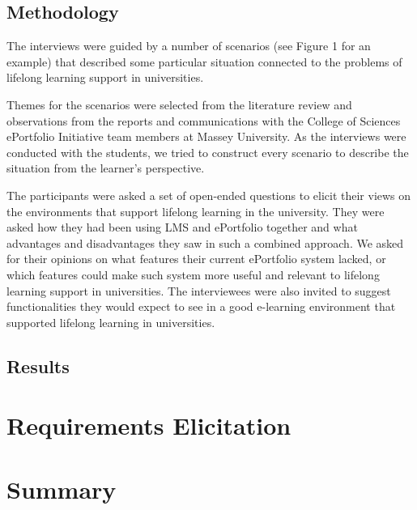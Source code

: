 \subsection{Methodology}

The interviews were guided by a number of scenarios (see Figure 1 for an
example) that described some particular situation connected to the problems of
lifelong learning support in universities.

Themes for the scenarios were selected from the literature review and
observations from the reports and communications with the College of Sciences
ePortfolio Initiative team members at Massey University. As the interviews were
conducted with the students, we tried to construct every scenario to describe
the situation from the learner’s perspective.

The participants were asked a set of open-ended questions to elicit their views
on the environments that support lifelong learning in the university. They were
asked how they had been using LMS and ePortfolio together and what advantages
and disadvantages they saw in such a combined approach. We asked for their
opinions on what features their current ePortfolio system lacked, or which
features could make such system more useful and relevant to lifelong learning
support in universities. The interviewees were also invited to suggest
functionalities they would expect to see in a good e-learning environment that
supported lifelong learning in universities.

\subsection{Results}

\section{Requirements Elicitation}


\section{Summary}